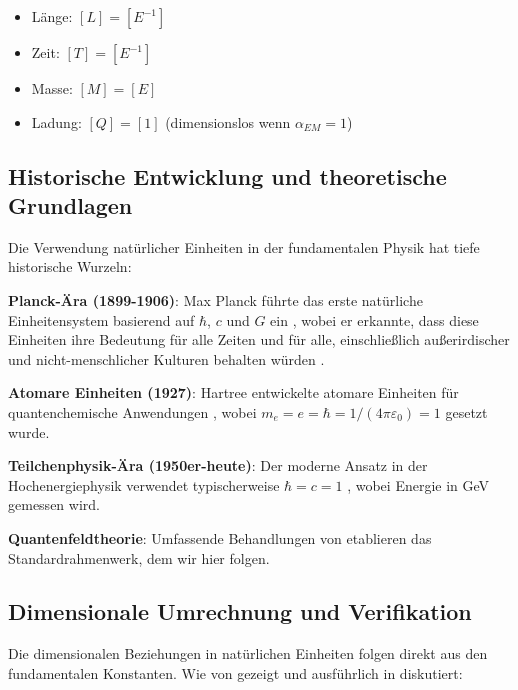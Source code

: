 \documentclass[12pt,a4paper]{article}
\begin{document}
	\begin{tcolorbox}[colback=blue!5!white,colframe=blue!75!black,title=Dimensionen in natürlichen Einheiten \citep{weinberg1995}]
		\begin{itemize}
			\item Länge: $[L] = [E^{-1}]$
			\item Zeit: $[T] = [E^{-1}]$ 
			\item Masse: $[M] = [E]$
			\item Ladung: $[Q] = [1]$ (dimensionslos wenn $\alpha_{EM} = 1$)
		\end{itemize}
	\end{tcolorbox}
	
	\subsection{Historische Entwicklung und theoretische Grundlagen}
	\label{subsec:historical_development}
	
	Die Verwendung natürlicher Einheiten in der fundamentalen Physik hat tiefe historische Wurzeln:
	
	\textbf{Planck-Ära (1899-1906)}: Max Planck führte das erste natürliche Einheitensystem basierend auf $\hbar$, $c$ und $G$ ein \citep{planck1900,planck1906}, wobei er erkannte, dass diese Einheiten ihre Bedeutung für alle Zeiten und für alle, einschließlich außerirdischer und nicht-menschlicher Kulturen behalten würden \citep{planck1906}.
	
	\textbf{Atomare Einheiten (1927)}: Hartree entwickelte atomare Einheiten für quantenchemische Anwendungen \citep{hartree1927,hartree1957}, wobei $m_e = e = \hbar = 1/(4\pi\varepsilon_0) = 1$ gesetzt wurde.
	
	\textbf{Teilchenphysik-Ära (1950er-heute)}: Der moderne Ansatz in der Hochenergiephysik verwendet typischerweise $\hbar = c = 1$ \citep{bjorken1964,itzykson1980}, wobei Energie in GeV gemessen wird.
	
	\textbf{Quantenfeldtheorie}: Umfassende Behandlungen von \citet{weinberg1995,peskin1995,srednicki2007} etablieren das Standardrahmenwerk, dem wir hier folgen.
	
	\subsection{Dimensionale Umrechnung und Verifikation}
	
	Die dimensionalen Beziehungen in natürlichen Einheiten folgen direkt aus den fundamentalen Konstanten. Wie von \citet{weinberg1995} gezeigt und ausführlich in \citet{zee2010} diskutiert:
	
\end{document}
